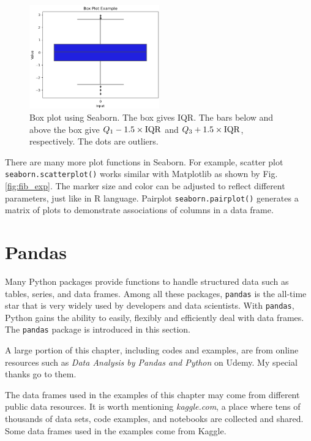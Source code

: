 \begin{figure}[htbp]
	\centering
	\includegraphics[width=0.5\textwidth]{./chapters/ch-python/figures/boxplotexp.png}
	\caption{Box plot using Seaborn. The box gives IQR. The bars below and above the box give $Q_1-1.5\times\textup{IQR}$ and $Q_3+1.5\times\textup{IQR}$, respectively. The dots are outliers.}
	\label{fig:boxplot}
\end{figure}

There are many more plot functions in Seaborn. For example, scatter plot \verb|seaborn.scatterplot()| works similar with Matplotlib as shown by Fig. \ref{fig:fib_exp}. The marker size and color can be adjusted to reflect different parameters, just like in R language. Pairplot \verb|seaborn.pairplot()| generates a matrix of plots to demonstrate associations of columns in a data frame.

\section{Pandas} \label{sec:pandas}

Many Python packages provide functions to handle structured data such as tables, series, and data frames. Among all these packages, \verb|pandas| is the all-time star that is very widely used by developers and data scientists. With \verb|pandas|, Python gains the ability to easily, flexibly and efficiently deal with data frames. The \verb|pandas| package is introduced in this section.

A large portion of this chapter, including codes and examples, are from online resources such as \textit{Data Analysis by Pandas and Python} on Udemy. My special thanks go to them.

The data frames used in the examples of this chapter may come from different public data resources. It is worth mentioning \textit{kaggle.com}, a place where tens of thousands of data sets, code examples, and notebooks are collected and shared. Some data frames used in the examples come from Kaggle.

